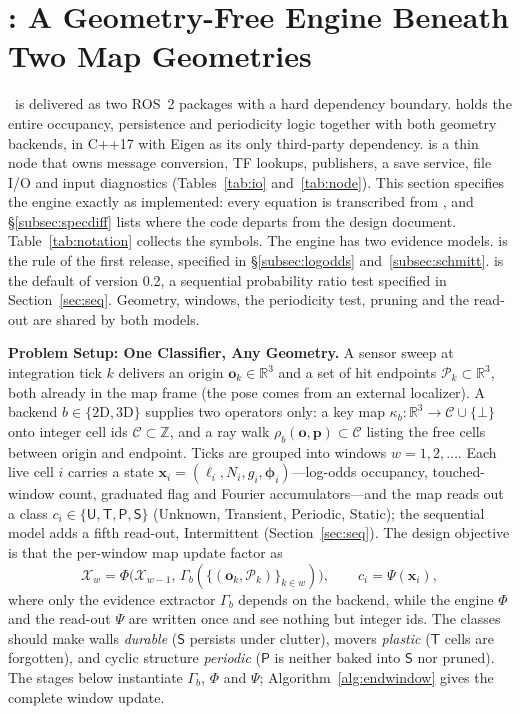 \section{\sname: A Geometry-Free Engine Beneath Two Map Geometries}\label{sec:method}

\sname\ is delivered as two ROS~2 packages with a hard dependency boundary.  holds the entire occupancy, persistence and periodicity logic together with both geometry backends, in C++17 with Eigen as its only third-party dependency.  is a thin node that owns message conversion, TF lookups, publishers, a save service, file I/O and input diagnostics (Tables~\ref{tab:io} and~\ref{tab:node}). This section specifies the engine exactly as implemented: every equation is transcribed from , and \S\ref{subsec:specdiff} lists where the code departs from the design document. Table~\ref{tab:notation} collects the symbols. The engine has two evidence models.  is the rule of the first release, specified in \S\ref{subsec:logodds} and~\ref{subsec:schmitt}.  is the default of version 0.2, a sequential probability ratio test specified in Section~\ref{sec:seq}. Geometry, windows, the periodicity test, pruning and the read-out are shared by both models.

\noindent\textbf{Problem Setup: One Classifier, Any Geometry.} A sensor sweep at integration tick $k$ delivers an origin $\mathbf{o}_k\in\mathbb{R}^3$ and a set of hit endpoints $\mathcal{P}_k\subset\mathbb{R}^3$, both already in the map frame (the pose comes from an external localizer). A backend $b\in\{\mathrm{2D},\mathrm{3D}\}$ supplies two operators only: a key map $\kappa_b:\mathbb{R}^3\to\mathcal{C}\cup\{\bot\}$ onto integer cell ids $\mathcal{C}\subset\mathbb{Z}$, and a ray walk $\rho_b(\mathbf{o},\mathbf{p})\subset\mathcal{C}$ listing the free cells between origin and endpoint. Ticks are grouped into windows $w=1,2,\dots$. Each live cell $i$ carries a state $\mathbf{x}_i=(\ell_i,N_i,g_i,\boldsymbol{\phi}_i)$---log-odds occupancy, touched-window count, graduated flag and Fourier accumulators---and the map reads out a class $c_i\in\{\mathsf{U},\mathsf{T},\mathsf{P},\mathsf{S}\}$ (Unknown, Transient, Periodic, Static); the sequential model adds a fifth read-out, Intermittent (Section~\ref{sec:seq}). The design objective is that the per-window map update factor as
\begin{equation}\label{eq:objective}
  \mathcal{X}_w=\Phi\big(\mathcal{X}_{w-1},\,\Gamma_b(\{(\mathbf{o}_k,\mathcal{P}_k)\}_{k\in w})\big),\qquad c_i=\Psi(\mathbf{x}_i),
\end{equation}
where only the evidence extractor $\Gamma_b$ depends on the backend, while the engine $\Phi$ and the read-out $\Psi$ are written once and see nothing but integer ids. The classes should make walls \emph{durable} ($\mathsf{S}$ persists under clutter), movers \emph{plastic} ($\mathsf{T}$ cells are forgotten), and cyclic structure \emph{periodic} ($\mathsf{P}$ is neither baked into $\mathsf{S}$ nor pruned). The stages below instantiate $\Gamma_b$, $\Phi$ and $\Psi$; Algorithm~\ref{alg:endwindow} gives the complete window update.

